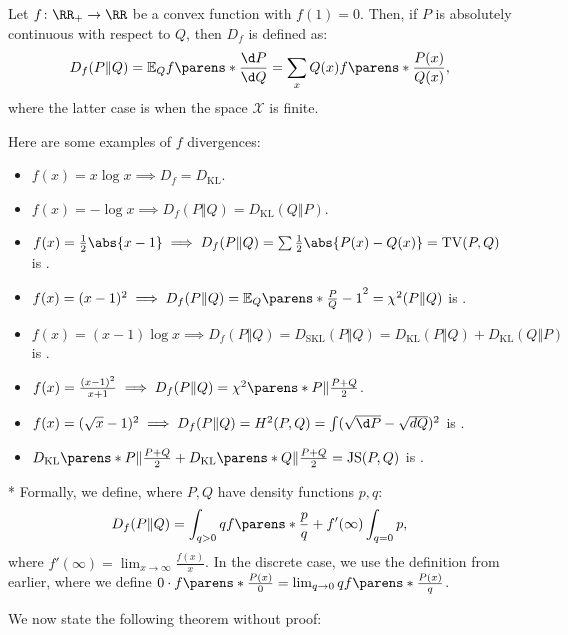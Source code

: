 \begin{defn}
	Let $f \colon \RR_+ \to \RR$ be a convex function with $f(1) = 0$. Then, if $P$ is absolutely continuous with respect to $Q$, then  $D_f$ is defined as: \[
		D_f(P\Vert Q) = \mathbb E_Q f\parens*{\frac{\d P}{\d Q}} = \sum_x Q(x) f\parens*{\frac{P(x)}{Q(x)}},
	\]
	where the latter case is when the space $\mathcal X$ is finite.
\end{defn}

\begin{exm}
	Here are some examples of $f$ divergences:
	\begin{itemize}
		\item $f(x) = x \log x \implies D_f = D_{\text{KL}}$.
		\item $f(x) = -\log x \implies D_f(P\Vert Q) = D_{\text{KL}}(Q\Vert P)$.
		\item $f(x) = \frac 12 \abs{x-1}\implies D_f(P\Vert Q) = \sum \frac 12 \abs{P(x) - Q(x)} = \operatorname{TV}(P, Q)$ is .
		\item $f(x) = (x-1)^2 \implies D_f(P\Vert Q) = \mathbb E_Q \parens*{\frac PQ -1}^2 = \chi^2(P\Vert Q)$ is .
		\item $f(x) = (x-1)\log x\implies D_f(P\Vert Q) = D_{\text{SKL}}(P\Vert Q) = D_{\text{KL}}(P\Vert Q) + D_{\text{KL}} (Q\Vert P)$ is .
		\item $f(x) = \frac{(x-1)^2}{x+1}\implies D_f(P\Vert Q) = \chi^2\parens*{P \Vert \frac{P+Q}2}$.
		\item $f(x) = (\sqrt x-1)^2 \implies D_f(P\Vert Q) = H^2(P,Q) = \int (\sqrt{\d P} - \sqrt{d Q})^2$ is .
		\item $D_{\text{KL}}\parens*{P \Vert \frac{P+Q}2} + D_{\text{KL}} \parens*{Q \Vert \frac{P+Q}{2}} = \operatorname{JS}(P,Q)$ is .
	\end{itemize}
\end{exm}

\begin{defn}*
	Formally, we define, where $P,Q$ have density functions $p, q$: \[
		D_f(P\Vert Q) = \int_{q > 0} q f\parens*{\frac pq} + f'(\infty) \int_{q = 0} p,
	\]
	where $f'(\infty) = \lim_{x\to \infty} \frac{f(x)}{x}$.
	In the discrete case, we use the definition from earlier, where we define $0 \cdot f\parens*{\frac{P(x)}{0}} = \lim_{q\to 0} q f \parens*{\frac{P(x)}q}$.
\end{defn}	

We now state the following theorem without proof:

